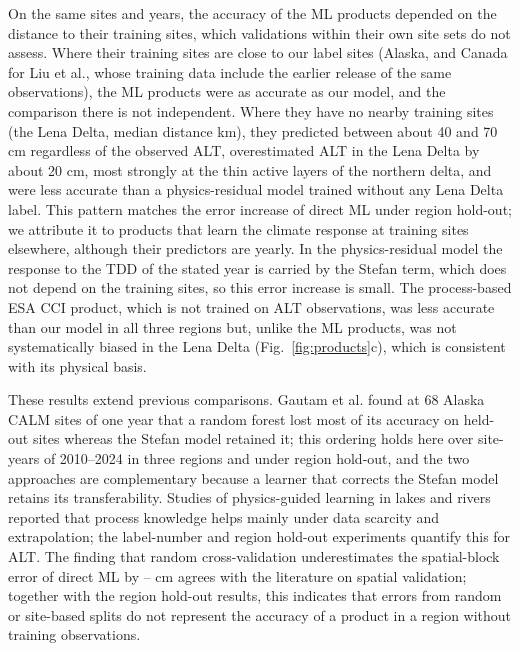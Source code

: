 On the same sites and years, the accuracy of the ML products depended on the distance to their training sites, which validations within their own site sets do not assess. Where their training sites are close to our label sites (Alaska, and Canada for Liu et al., whose training data include the earlier release of the same observations), the ML products were as accurate as our model, and the comparison there is not independent. Where they have no nearby training sites (the Lena Delta, median distance \ndistweiLemed{} km), they predicted between about 40 and 70 cm regardless of the observed ALT, overestimated ALT in the Lena Delta by about 20 cm, most strongly at the thin active layers of the northern delta, and were less accurate than a physics-residual model trained without any Lena Delta label. This pattern matches the error increase of direct ML under region hold-out; we attribute it to products that learn the climate response at training sites elsewhere, although their predictors are yearly. In the physics-residual model the response to the TDD of the stated year is carried by the Stefan term, which does not depend on the training sites, so this error increase is small. The process-based ESA CCI product, which is not trained on ALT observations, was less accurate than our model in all three regions but, unlike the ML products, was not systematically biased in the Lena Delta (Fig.~\ref{fig:products}c), which is consistent with its physical basis.

These results extend previous comparisons. Gautam et al.\cite{Gautam2025} found at 68 Alaska CALM sites of one year that a random forest lost most of its accuracy on held-out sites whereas the Stefan model retained it; this ordering holds here over site-years of 2010--2024 in three regions and under region hold-out, and the two approaches are complementary because a learner that corrects the Stefan model retains its transferability. Studies of physics-guided learning in lakes and rivers reported that process knowledge helps mainly under data scarcity and extrapolation\cite{Read2019,Jia2021,Willard2022}; the label-number and region hold-out experiments quantify this for ALT. The finding that random cross-validation underestimates the spatial-block error of direct ML by \noptimLeDz--\noptimCaDz{} cm agrees with the literature on spatial validation\cite{Roberts2017,Ploton2020,MeyerPebesma2022}; together with the region hold-out results, this indicates that errors from random or site-based splits do not represent the accuracy of a product in a region without training observations.

